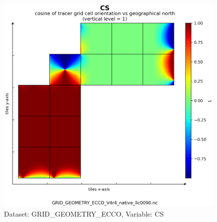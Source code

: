 \begin{figure}[H]
\centering
\includegraphics[scale=0.55]{../images/plots/native_plots_coords/Geometry_Parameters_for_the_Lat-Lon-Cap_90_(llc90)_Native_Model_Grid_(Version_4_Release_4)/CS.png}
\caption{Dataset: GRID\_GEOMETRY\_ECCO, Variable: CS}
\label{tab:table-GRID_GEOMETRY_ECCO_CS-Plot}
\end{figure}
\newpage
\pagebreak
